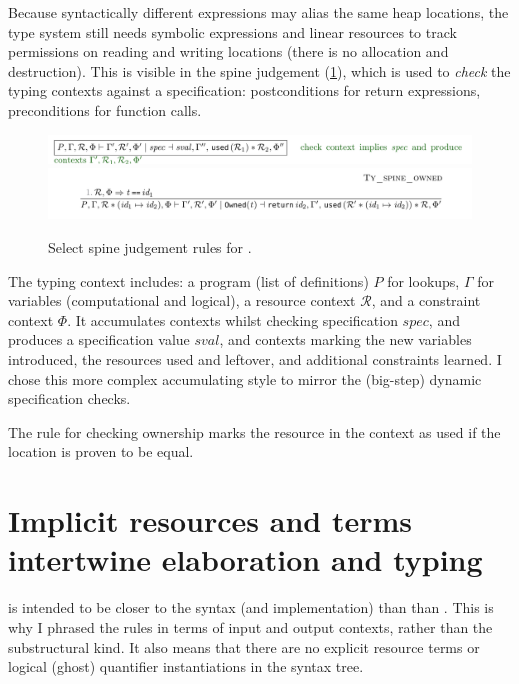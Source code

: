 Because syntactically different expressions may alias the same heap locations,
the type system still needs symbolic expressions and linear resources to track
permissions on reading and writing locations (there is no allocation and
destruction). This is visible in the spine judgement (\cref{fig:minicn-spine}),
which is used to \emph{check} the typing contexts against a specification:
postconditions for return expressions, preconditions for function calls.

\begin{figure}[tpb]
    \ContinuedFloat*
    \includegraphics{figures/minicn-spine-1}
    \includegraphics{figures/minicn-spine-2}
    \caption{Select spine judgement rules for .}\label{fig:minicn-spine}
\end{figure}

The typing context includes: a program (list of definitions) $P$ for lookups,
$\Gamma$ for variables (computational and logical), a resource context
$\mathcal{R}$, and a constraint context $\Phi$. It accumulates contexts whilst
checking specification $\mathit{spec}$, and produces a specification value
$\mathit{sval}$, and contexts marking the new variables introduced, the
resources used and leftover, and additional constraints learned. I chose this
more complex accumulating style to mirror the (big-step) dynamic specification
checks.

The rule for checking ownership marks the resource in the context as
used if the location is proven to be equal.

\section{Implicit resources and terms intertwine elaboration and typing}

 is intended to be closer to the syntax (and implementation) than
than . This is why I phrased the rules in terms of input and
output contexts, rather than the substructural kind. It also means that there
are no explicit resource terms or logical (ghost) quantifier instantiations in
the syntax tree.

